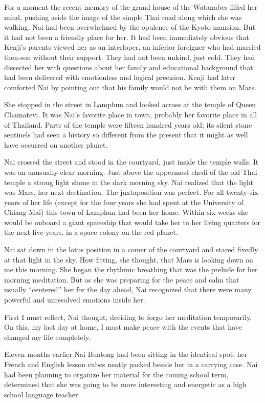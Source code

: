 \documentclass[]{article}
\begin{document}
{For a moment the recent memory of the grand house of the Watanabes filled her mind, pushing aside the image of the simple Thai road along which she was walking.  Nai had been overwhelmed by the opulence of the Kyoto mansion.  But it had not been a friendly place for her.  It had been immediately obvious that Kenji’s parents viewed her as an interloper, an inferior foreigner who had married then-son without their support.  They had not been unkind, just cold.  They had dissected her with questions about her family and educational background that had been delivered with emotionless and logical precision.  Kenji had later comforted Nai by pointing out that his family would not be with them on Mars.

She stopped in the street in Lamphun and looked across at the temple of Queen Chamatevi.  It was Nai’s favorite place in town, probably her favorite place in all of Thailand.  Parts of the temple were fifteen hundred years old; its silent stone sentinels had seen a history so different from the present that it might as well have occurred on another planet.

Nai crossed the street and stood in the courtyard, just inside the temple walls.  It was an unusually clear morning.  Just above the uppermost chedi of the old Thai temple a strong light shone in the dark morning sky.  Nai realized that the light was Mars, her next destination.  The juxtaposition was perfect.  For all twenty-six years of her life (except for the four years she had spent at the University of Chiang Mai) this town of Lamphun had been her home.  Within six weeks she would be onboard a giant spaceship that would take her to her living quarters for the next five years, in a space colony on the red planet.

Nai sat down in the lotus position in a comer of the courtyard and stared fixedly at that light in the sky.  How fitting, she thought, that Mars is looking down on me this morning.  She began the rhythmic breathing that was the prelude for her morning meditation.  But as she was preparing for the peace and calm that usually “centered” her for the day ahead, Nai recognized that there were many powerful and unresolved emotions inside her.

First I must reflect, Nai thought, deciding to forgo her meditation temporarily.  On this, my last day at home, I must make peace with the events that have changed my life completely.

Eleven months earlier Nai Buatong had been sitting in the identical spot, her French and English lesson cubes neatly packed beside her in a carrying case.  Nai had been planning to organize her material for the coming school term, determined that she was going to be more interesting and energetic as a high school language teacher.

}
\end{document}
